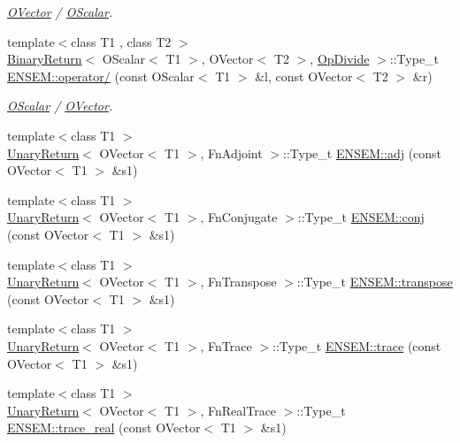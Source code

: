\begin{DoxyCompactItemize}
\begin{DoxyCompactList}\small\item\em \mbox{\hyperlink{classENSEM_1_1OVector}{O\+Vector}} / \mbox{\hyperlink{classENSEM_1_1OScalar}{O\+Scalar}}. \end{DoxyCompactList}\item 
{\footnotesize template$<$class T1 , class T2 $>$ }\\\mbox{\hyperlink{structBinaryReturn}{Binary\+Return}}$<$ O\+Scalar$<$ T1 $>$, O\+Vector$<$ T2 $>$, \mbox{\hyperlink{structOpDivide}{Op\+Divide}} $>$\+::Type\+\_\+t \mbox{\hyperlink{group__obsvector_gaf4f1f6a048cad788e11294a211380fab}{E\+N\+S\+E\+M\+::operator/}} (const O\+Scalar$<$ T1 $>$ \&l, const O\+Vector$<$ T2 $>$ \&r)
\begin{DoxyCompactList}\small\item\em \mbox{\hyperlink{classENSEM_1_1OScalar}{O\+Scalar}} / \mbox{\hyperlink{classENSEM_1_1OVector}{O\+Vector}}. \end{DoxyCompactList}\item 
{\footnotesize template$<$class T1 $>$ }\\\mbox{\hyperlink{structUnaryReturn}{Unary\+Return}}$<$ O\+Vector$<$ T1 $>$, Fn\+Adjoint $>$\+::Type\+\_\+t \mbox{\hyperlink{group__obsvector_gab801d265f143d9dca7ac1e3298640bf7}{E\+N\+S\+E\+M\+::adj}} (const O\+Vector$<$ T1 $>$ \&s1)
\item 
{\footnotesize template$<$class T1 $>$ }\\\mbox{\hyperlink{structUnaryReturn}{Unary\+Return}}$<$ O\+Vector$<$ T1 $>$, Fn\+Conjugate $>$\+::Type\+\_\+t \mbox{\hyperlink{group__obsvector_ga77a1805866a66a7f5215fb784b9c2725}{E\+N\+S\+E\+M\+::conj}} (const O\+Vector$<$ T1 $>$ \&s1)
\item 
{\footnotesize template$<$class T1 $>$ }\\\mbox{\hyperlink{structUnaryReturn}{Unary\+Return}}$<$ O\+Vector$<$ T1 $>$, Fn\+Transpose $>$\+::Type\+\_\+t \mbox{\hyperlink{group__obsvector_ga9c3c97af68e1cfa2eb913c66fa87188b}{E\+N\+S\+E\+M\+::transpose}} (const O\+Vector$<$ T1 $>$ \&s1)
\item 
{\footnotesize template$<$class T1 $>$ }\\\mbox{\hyperlink{structUnaryReturn}{Unary\+Return}}$<$ O\+Vector$<$ T1 $>$, Fn\+Trace $>$\+::Type\+\_\+t \mbox{\hyperlink{group__obsvector_ga7b30f87898883f11b8b43b5b3df77bea}{E\+N\+S\+E\+M\+::trace}} (const O\+Vector$<$ T1 $>$ \&s1)
\item 
{\footnotesize template$<$class T1 $>$ }\\\mbox{\hyperlink{structUnaryReturn}{Unary\+Return}}$<$ O\+Vector$<$ T1 $>$, Fn\+Real\+Trace $>$\+::Type\+\_\+t \mbox{\hyperlink{group__obsvector_ga89062217a6c2e9173699e36b88ed9b05}{E\+N\+S\+E\+M\+::trace\+\_\+real}} (const O\+Vector$<$ T1 $>$ \&s1)

\end{DoxyCompactItemize}
